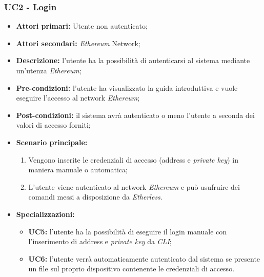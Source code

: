 \subsubsection{UC2 - Login}
\begin{itemize}
	\item \textbf{Attori primari:} Utente non autenticato;
	\item \textbf{Attori secondari:} \textit{Ethereum\glo} Network;
	\item \textbf{Descrizione:} l'utente ha la possibilità di autenticarsi al sistema mediante un'utenza \textit{Ethereum\glos}; 
	\item \textbf{Pre-condizioni:} l'utente ha visualizzato la guida introduttiva e vuole eseguire l'accesso al network \textit{Ethereum\glos};
	\item \textbf{Post-condizioni:} il sistema avrà autenticato o meno l'utente a seconda dei valori di accesso forniti;
	\item \textbf{Scenario principale:} 
	\begin{enumerate}
		\item Vengono inserite le credenziali di accesso (address e \textit{private key\glos}) in maniera manuale o automatica;
		\item L'utente viene autenticato al network \textit{Ethereum\glo} e può usufruire dei comandi messi a disposizione da \textit{Etherless}.
	\end{enumerate}
	\item \textbf{Specializzazioni:}
	\begin{itemize}
		\item \textbf{UC5:} l'utente ha la possibilità di eseguire il login manuale con l'inserimento di address e \textit{private key\glo} da \textit{CLI\glos};
		\item \textbf{UC6:} l'utente verrà automaticamente autenticato dal sistema se presente un file sul proprio dispositivo contenente le credenziali di accesso.  
	\end{itemize}
\end{itemize}
